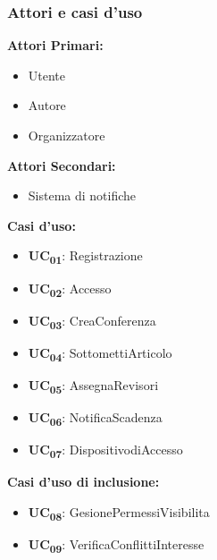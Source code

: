 \subsubsection{Attori e casi d'uso}
\begin{center}
\begin{minipage}[t]{0.5\textwidth}
\textbf{Attori Primari:}
\begin{itemize}
\item Utente
\item Autore
\item Organizzatore
\end{itemize}  
\end{minipage}%
\begin{minipage}[t]{0.5\textwidth}
\textbf{Attori Secondari:}
\begin{itemize}
\item Sistema di notifiche
\end{itemize}  
\end{minipage}%
\end{center}

\noindent
\textbf{Casi d'uso:}
\begin{itemize}
\item \textbf{UC\textsubscript{01}}: Registrazione
\item \textbf{UC\textsubscript{02}}: Accesso
\item \textbf{UC\textsubscript{03}}: CreaConferenza
\item \textbf{UC\textsubscript{04}}: SottomettiArticolo
\item \textbf{UC\textsubscript{05}}: AssegnaRevisori
\item \textbf{UC\textsubscript{06}}: NotificaScadenza
\item \textbf{UC\textsubscript{07}}: DispositivodiAccesso
\end{itemize}

\textbf{Casi d'uso di inclusione:}
\begin{itemize}
\item \textbf{UC\textsubscript{08}}: GesionePermessiVisibilita
\item \textbf{UC\textsubscript{09}}: VerificaConflittiInteresse
\end{itemize}

